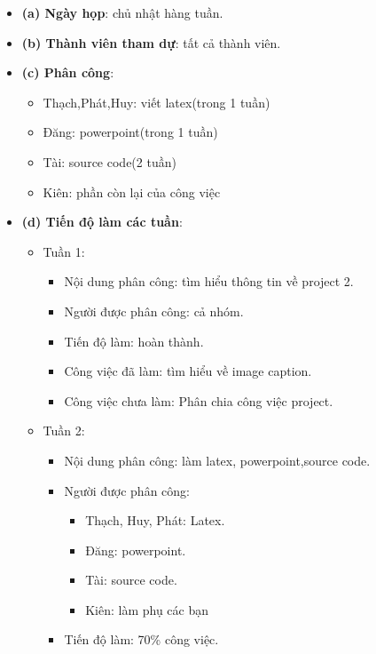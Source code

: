 \documentclass{article}
\begin{document}
\begin{itemize}
    \item \textbf{(a) Ngày họp}: chủ nhật hàng tuần.
    \item \textbf{(b) Thành viên tham dự}: tất cả thành viên.
    \item \textbf{(c) Phân công}:
        \begin{itemize}
            \item Thạch,Phát,Huy: viết latex(trong 1 tuần)
            \item Đăng: powerpoint(trong 1 tuần)
            \item Tài: source code(2 tuần)
            \item Kiên: phần còn lại của công việc
        \end{itemize}
    \item \textbf{(d) Tiến độ làm các tuần}:
        \begin{itemize}
            \item Tuần 1:
                \begin{itemize}
                    \item Nội dung phân công: tìm hiểu thông tin về project 2.
                    \item Người được phân công: cả nhóm.
                    \item Tiến độ làm: hoàn thành.
                    \item Công việc đã làm: tìm hiểu về image caption.
                    \item Công việc chưa làm: Phân chia công việc project.
                \end{itemize}
            \item Tuần 2:
                \begin{itemize}
                    \item Nội dung phân công: làm latex, powerpoint,source code.
                    \item Người được phân công:
                        \begin{itemize}
                            \item Thạch, Huy, Phát: Latex.
                            \item Đăng: powerpoint.
                            \item Tài: source code.
                            \item Kiên: làm phụ các bạn
                        \end{itemize}
                    \item Tiến độ làm: 70\% công việc.

\end{itemize}
\end{itemize}
\end{itemize}
\end{document}
